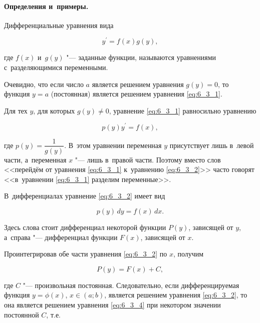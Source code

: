 
\paragraph{Определения и~примеры.}
Дифференциальные уравнения вида 

\begin{equation}\label{eq:6_3_1}
y^\prime = f(x)g(y),
\end{equation}

\noindent
где $f(x)$ и~$g(y)$ "--- заданные функции, называются уравнениями с~разделяющимися
переменными.

Очевидно, что если число $a$ является решением уравнения $g(y) = 0$,
то функция $y = a$ (постоянная) является решением уравнения \eqref{eq:6_3_1}.

Для тех $y$, для которых $g(y) \ne 0$, уравнение \eqref{eq:6_3_1} равносильно
уравнению

\begin{equation}\label{eq:6_3_2}
p(y)y^\prime = f(x),
\end{equation}

\noindent
где $p(y) = \dfrac{1}{g(y)}$. В~этом уравнении переменная $y$ присутствует лишь
в~левой части, а~переменная $x$ "--- лишь в~правой части. Поэтому вместо слов
<<перейдём от уравнения \eqref{eq:6_3_1} к~уравнению \eqref{eq:6_3_2}>>
часто говорят <<в~уравнении \eqref{eq:6_3_1} разделим переменные>>.

В~дифференциалах уравнение \eqref{eq:6_3_2} имеет вид

\begin{equation}\label{eq:6_3_3}
p(y) \, dy = f(x) \, dx.
\end{equation}

\noindent
Здесь слова стоит дифференциал некоторой функции $P(y)$, зависящей от $y$,
а~справа "--- дифференциал функции $F(x)$, зависящей от $x$.

Проинтегрировав обе части уравнения \eqref{eq:6_3_2} по $x$, получим

\begin{equation}\label{eq:6_3_4}
P(y) = F(x) + C,
\end{equation}

\noindent
где $C$ "--- произвольная постоянная. Следовательно, если дифференцируемая функция
$y = \phi(x)$, $x \in (a; b)$, является решением уравнения \eqref{eq:6_3_2},
то она является решением уравнения \eqref{eq:6_3_4} при некотором значении
постоянной $C$, т.е.\

